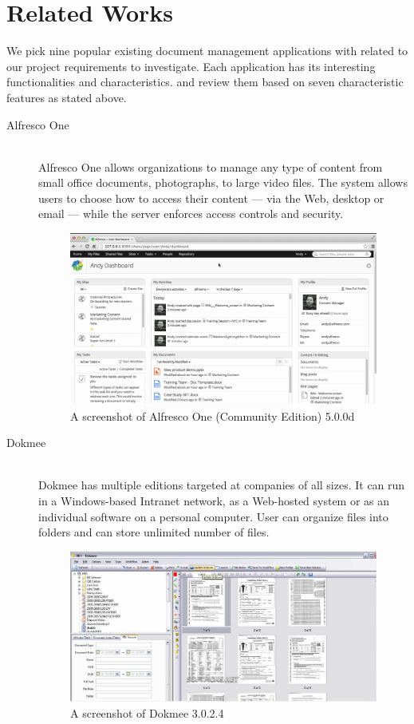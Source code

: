 \section{Related Works} \label{relate-works}
We pick nine popular existing document management applications with related to our project requirements to investigate.
Each application has its interesting functionalities and characteristics.
and review them based on seven characteristic features as stated above.

\begin{description}
\item[Alfresco One] \hfill \\
Alfresco One allows organizations to manage any type of content from small office documents, photographs, to large video files.
The system allows users to choose how to access their content --- via the Web, desktop or email --- while the server enforces access controls and security.
\begin{figure}[h]
	\centering
	\includegraphics[scale=0.4]{res/literature/screenshot_alfresco}
	\caption{A screenshot of Alfresco One (Community Edition) 5.0.0d  \cite{alfresco}}
\end{figure}

\item[Dokmee] \hfill \\
Dokmee has multiple editions targeted at companies of all sizes.
It can run in a Windows-based Intranet network, as a Web-hosted system or as an individual software on a personal computer.
User can organize files into folders and can store unlimited number of files.
\begin{figure}[ht]
	\centering
	\includegraphics[scale=0.55]{res/literature/screenshot_dokmee}
	\caption{A screenshot of Dokmee 3.0.2.4  \cite{dokmee}}
\end{figure}


\end{description}
